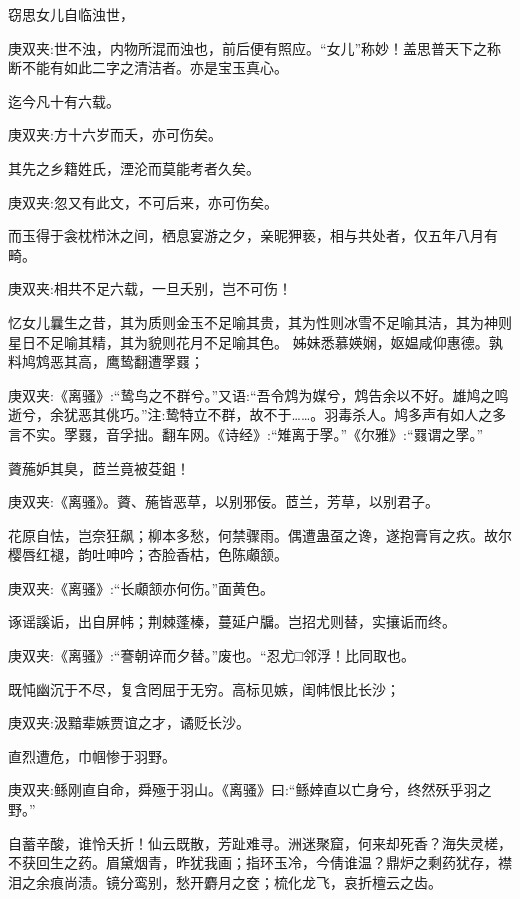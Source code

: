\begin{qute2sp}
    \begin{parag}
        窃思女儿自临浊世，
        \begin{note}庚双夹:世不浊，内物所混而浊也，前后便有照应。“女儿”称妙！盖思普天下之称断不能有如此二字之清洁者。亦是宝玉真心。\end{note}
        迄今凡十有六载。
        \begin{note}庚双夹:方十六岁而夭，亦可伤矣。\end{note}
        其先之乡籍姓氏，湮沦而莫能考者久矣。
        \begin{note}庚双夹:忽又有此文，不可后来，亦可伤矣。\end{note}
        而玉得于衾枕栉沐之间，栖息宴游之夕，亲昵狎亵，相与共处者，仅五年八月有畸。
        \begin{note}庚双夹:相共不足六载，一旦夭别，岂不可伤！\end{note}
        忆女儿曩生之昔，其为质则金玉不足喻其贵，其为性则冰雪不足喻其洁，其为神则星日不足喻其精，其为貌则花月不足喻其色。
        姊妹悉慕媖娴，妪媪咸仰惠德。孰料鸠鸩恶其高，鹰鸷翻遭罦罬；
        \begin{note}庚双夹:《离骚》:“鸷鸟之不群兮。”又语:“吾令鸩为媒兮，鸩告余以不好。雄鸠之鸣逝兮，余犹恶其佻巧。”注:鸷特立不群，故不于……。羽毒杀人。鸠多声有如人之多言不实。罦罬，音孚拙。翻车网。《诗经》:“雉离于罦。”《尔雅》:“罬谓之罦。”\end{note}
        薋葹妒其臭，茝兰竟被芟鉏！
        \begin{note}庚双夹:《离骚》。薋、葹皆恶草，以别邪佞。茝兰，芳草，以别君子。\end{note}
        花原自怯，岂奈狂飙；柳本多愁，何禁骤雨。偶遭蛊虿之谗，遂抱膏肓之疚。故尔樱唇红褪，韵吐呻吟；杏脸香枯，色陈顑颔。
        \begin{note}庚双夹:《离骚》:“长顑颔亦何伤。”面黄色。\end{note}
        诼谣謑诟，出自屏帏；荆棘蓬榛，蔓延户牖。岂招尤则替，实攘诟而终。
        \begin{note}庚双夹:《离骚》:“謇朝谇而夕替。”废也。“忍尤□邻浮！比同取也。\end{note}
        既忳幽沉于不尽，复含罔屈于无穷。高标见嫉，闺帏恨比长沙；
        \begin{note}庚双夹:汲黯辈嫉贾谊之才，谲贬长沙。\end{note}
        直烈遭危，巾帼惨于羽野。
        \begin{note}庚双夹:鲧刚直自命，舜殛于羽山。《离骚》曰:“鲧婞直以亡身兮，终然殀乎羽之野。”\end{note}
        自蓄辛酸，谁怜夭折！仙云既散，芳趾难寻。洲迷聚窟，何来却死香？海失灵槎，不获回生之药。眉黛烟青，昨犹我画；指环玉冷，今倩谁温？鼎炉之剩药犹存，襟泪之余痕尚渍。镜分鸾别，愁开麝月之奁；梳化龙飞，哀折檀云之齿。

\end{parag}
\end{qute2sp}
